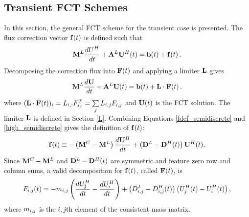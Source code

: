 \subsection{Transient FCT Schemes}
In this section, the general FCT scheme for the transient case is presented.
The flux correction vector $\mathbf{f}(t)$ is defined such that
\begin{equation}\label{fdef_semidiscrete}
   \mathbf{M}^L\frac{dU^{H}}{dt} + \mathbf{A}^L\mathbf{U}^H(t) = \mathbf{b}(t) + \mathbf{f}(t) \,.
\end{equation}
Decomposing the correction flux into $\mathbf{F}(t)$ and applying a limiter $\mathbf{L}$ gives
\begin{equation}\label{limited_semidiscrete}
   \mathbf{M}^L\frac{d\mathbf{U}}{dt} + \mathbf{A}^L\mathbf{U}(t) = \mathbf{b}(t) + \mathbf{L}\cdot\mathbf{F}(t) \,.
\end{equation}
where $(\mathbf{L}\cdot\mathbf{F}(t))_i = L_{i,:}F_{i,:}^T = \sum\limits_j L_{i,j} F_{i,j}$
and $\mathbf{U}(t)$ is the FCT solution. The limiter $\mathbf{L}$ is
defined in Section \ref{L}.
Combining Equations \eqref{fdef_semidiscrete} and \eqref{high_semidiscrete}
gives the definition of $\mathbf{f}(t)$:
\begin{equation}\label{f_semidiscrete}
   \mathbf{f}(t) \equiv -\left(\mathbf{M}^C-\mathbf{M}^L\right)\frac{d\mathbf{U}^H}{dt} + \left(\mathbf{D}^L-\mathbf{D}^H(t)\right)\mathbf{U}^H(t).
\end{equation}
Since $\mathbf{M}^C-\mathbf{M}^L$ and $\mathbf{D}^L-\mathbf{D}^H(t)$ are symmetric
and feature zero row and column sums, a valid decomposition for $\mathbf{f}(t)$,
called $\mathbf{F}(t)$, is
\begin{equation}
   F_{i,j}(t) = -m_{i,j}\left(\frac{dU_j^H}{dt} - \frac{dU_i^H}{dt}\right)
   + \left(D_{i,j}^L-D_{i,j}^H(t)\right)\left(U_j^H(t) - U_i^H(t)\right),
\end{equation}
where $m_{i,j}$ is the $i,j$th element of the consistent mass matrix.
